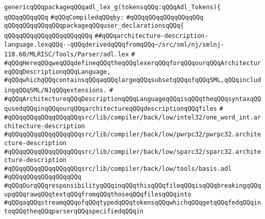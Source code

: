 \label{src/lib/compiler/back/low/tools/parser/architecture-description-language.lex.pkg}
\verb|genericqQQqpackageqQQqadl_lex_g(tokensqQQq:qQQqAdl_Tokens){|\newline
\verb|qQQqqQQqqQQq|\newline
\verb|#qQQqCompiledqQQqby:|\newline
\verb|#qQQqqQQqqQQqqQQqqQQq|\newline
\newline
\verb|qQQqqQQqqQQqqQQqpackageqQQquser_declarationsqQQq{|\newline
\verb|qQQqqQQqqQQqqQQqqQQqqQQq|\newline
\verb|##qQQqarchitecture-description-language.lexqQQq--qQQqderivedqQQqfromqQQq~/src/sml/nj/smlnj-110.60/MLRISC/Tools/Parser/adl.lex|\newline
\verb|#|\newline
\verb|#qQQqHereqQQqweqQQqdefineqQQqtheqQQqlexerqQQqforqQQqourqQQqArchitectureqQQqDescriptionqQQqLanguage,|\newline
\verb|#qQQqwhichqQQqcontainsqQQqaqQQqlargeqQQqsubsetqQQqofqQQqSML,qQQqincludingqQQqSML/NJqQQqextensions.|\newline
\verb|#|\newline
\verb|#qQQqArchitectureqQQqDescriptionqQQqLanguageqQQqisqQQqtheqQQqsyntaxqQQqusedqQQqinqQQqourqQQqarchitectureqQQqdescriptionqQQqfiles|\newline
\verb|#|\newline
\verb|#qQQqqQQqqQQqqQQqqQQqsrc/lib/compiler/back/low/intel32/one_word_int.architecture-description|\newline
\verb|#qQQqqQQqqQQqqQQqqQQqsrc/lib/compiler/back/low/pwrpc32/pwrpc32.architecture-description|\newline
\verb|#qQQqqQQqqQQqqQQqqQQqsrc/lib/compiler/back/low/sparc32/sparc32.architecture-description|\newline
\verb|#qQQqqQQqqQQqqQQqqQQqsrc/lib/compiler/back/low/tools/basis.adl|\newline
\verb|#qQQqqQQqqQQqqQQqqQQq|\newline
\verb|#qQQqOurqQQqresponsibilityqQQqinqQQqthisqQQqfileqQQqisqQQqbreakingqQQqupqQQqrawqQQqtextqQQqfromqQQqthoseqQQqfilesqQQqinto|\newline
\verb|#qQQqaqQQqstreamqQQqofqQQqtypedqQQqtokensqQQqwhichqQQqgetqQQqfedqQQqintoqQQqtheqQQqparserqQQqspecifiedqQQqin|\newline
